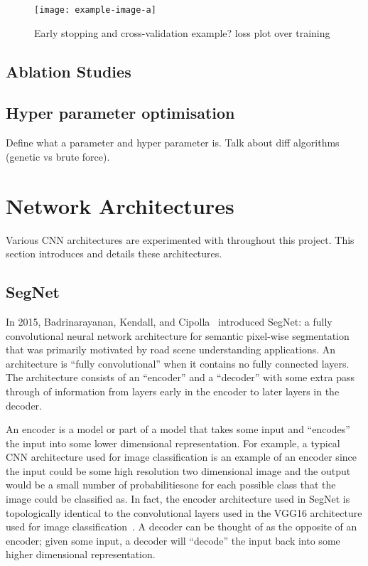 \begin{figure}[t]
    \centering
    \texttt{[image: example-image-a]}
    \caption{Early stopping and cross-validation example? loss plot over training}
    \label{fig:earlystop}
\end{figure}

\subsection{Ablation Studies}

\subsection{Hyper parameter optimisation}
\label{sec:hyperparam}

Define what a parameter and hyper parameter is. Talk about diff algorithms (genetic vs brute force).

\section{Network Architectures}

Various CNN architectures are experimented with throughout this project. This section introduces and details these architectures.

\subsection{SegNet}

In 2015, Badrinarayanan, Kendall, and Cipolla~\cite{segnet} introduced SegNet: a fully convolutional neural network architecture for semantic pixel-wise segmentation that was primarily motivated by road scene understanding applications. An architecture is ``fully convolutional'' when it contains no fully connected layers. The architecture consists of an ``encoder'' and a ``decoder'' with some extra pass through of information from layers early in the encoder to later layers in the decoder.

An encoder is a model or part of a model that takes some input and ``encodes'' the input into some lower dimensional representation. For example, a typical CNN architecture used for image classification is an example of an encoder since the input could be some high resolution two dimensional image and the output would be a small number of probabilities\textemdash one for each possible class that the image could be classified as. In fact, the encoder architecture used in SegNet is topologically identical to the convolutional layers used in the VGG16 architecture used for image classification~\cite{segnet, vgg16}. A decoder can be thought of as the opposite of an encoder; given some input, a decoder will ``decode'' the input back into some higher dimensional representation.

